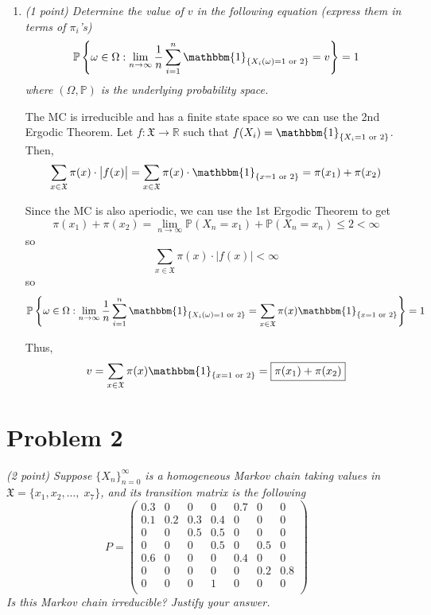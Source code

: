 \documentclass[12pt]{article}
\renewcommand{\P}{\mathbb{P}}
\newcommand{\R}{\mathbb{R}}
\newcommand{\ind}{\mathbbm{1}}
\newcommand{\mfX}{\mathfrak{X}}
\begin{document}
\begin{enumerate}[label=(\alph*)]
        \item \emph{(1 point) Determine the value of $v$ in the following equation (express them in terms of
        $\pi_i$'s)}
        \[\P\left\{\omega \in \Omega: \lim_{n\to \infty} \frac{1}{n}\sum_{i=1}^n \ind_{\{X_i(\omega) = 1 \text{ or } 2\}} = v\\\right\} = 1\]
        \emph{where $(\Omega, \P)$ is the underlying probability space.}

            \color{blue}
                The MC is irreducible and has a finite state space so we can use the 2nd Ergodic Theorem. Let $f: \mfX \to \R$ such that $f(X_i) = \ind_{\{X_i = 1 \text{ or } 2\}}$. Then, 
                \[\sum_{x \in \mfX} \pi(x) \cdot \big\vert f(x)\big\vert = \sum_{x \in \mfX} \pi(x) \cdot \ind_{\{x = 1 \text{ or } 2\}} = \pi(x_1) + \pi(x_2)\]

                Since the MC is also aperiodic, we can use the 1st Ergodic Theorem to get
                \[\pi(x_1) + \pi(x_2) = \lim_{n\to \infty} \P(X_n = x_1) + \P(X_n = x_n) \leq 2 < \infty \]
                so 
                \[\sum_{x \in \mfX} \pi(x) \cdot \big\vert f(x)\big\vert < \infty\]
                so 
                \[\P\left\{\omega \in \Omega: \lim_{n\to \infty} \frac{1}{n}\sum_{i=1}^n \ind_{\{X_i(\omega) = 1 \text{ or } 2\}} = \sum_{x \in \mfX} \pi(x) \ind_{\{x = 1 \text{ or } 2\}}\\\right\} = 1\]

                Thus,
                \[v =  \sum_{x \in \mfX} \pi(x) \ind_{\{x = 1 \text{ or } 2\}} = \boxed{\pi(x_1) + \pi(x_2)}\]
            \color{black}

    \end{enumerate}

\pagebreak

\section*{Problem 2}
    \emph{(2 point) Suppose $\{X_n\}_{n=0}^\infty$ is a homogeneous Markov chain taking values in $\mfX = \{x_1, x_2, \dots,\; x_7\}$, and its transition matrix is the following}
    \[P = \begin{pmatrix}
        0.3 & 0 & 0 & 0 & 0.7 & 0 & 0\\
        0.1 & 0.2 & 0.3 & 0.4 & 0 & 0 & 0\\
        0 & 0 & 0.5 & 0.5 & 0 & 0 & 0\\
        0 & 0 & 0 & 0.5 & 0 & 0.5 & 0\\
        0.6 & 0 & 0 & 0 & 0.4 & 0 & 0\\
        0 & 0 & 0 & 0 & 0 & 0.2 & 0.8\\
        0 & 0 & 0 & 1 & 0 & 0 & 0\\
    \end{pmatrix}\]
    \emph{Is this Markov chain irreducible? Justify your answer.}
\end{document}
